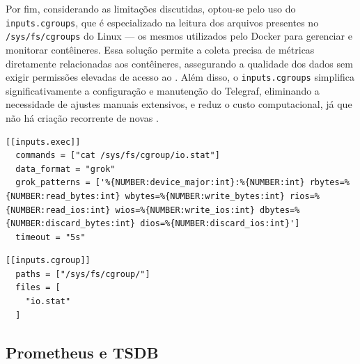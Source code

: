 Por fim, considerando as limitações discutidas, optou-se pelo uso do  \verb|inputs.cgroups|, que é especializado na leitura dos arquivos presentes no  \verb|/sys/fs/cgroups| do Linux --- os mesmos utilizados pelo Docker para gerenciar e monitorar contêineres. Essa solução permite a coleta precisa de métricas diretamente relacionadas aos contêineres, assegurando a qualidade dos dados sem exigir permissões elevadas de acesso ao . Além disso, o \verb|inputs.cgroups| simplifica significativamente a configuração e manutenção do Telegraf, eliminando a necessidade de ajustes manuais extensivos, e reduz o custo computacional, já que não há criação recorrente de novas .


\begin{lstlisting}[caption={Leitura da métrica "io.stat" com inputs.exec}, label={lst:inputs_exec}]
[[inputs.exec]]
  commands = ["cat /sys/fs/cgroup/io.stat"]
  data_format = "grok"
  grok_patterns = ['%{NUMBER:device_major:int}:%{NUMBER:int} rbytes=%{NUMBER:read_bytes:int} wbytes=%{NUMBER:write_bytes:int} rios=%{NUMBER:read_ios:int} wios=%{NUMBER:write_ios:int} dbytes=%{NUMBER:discard_bytes:int} dios=%{NUMBER:discard_ios:int}']
  timeout = "5s"
\end{lstlisting}

\begin{lstlisting}[caption={Leitura da mesma métrica "io.stat" com inputs.cgroups}, label={lst:inputs_cgroup}]
[[inputs.cgroup]]
  paths = ["/sys/fs/cgroup/"]
  files = [
    "io.stat"
  ]
\end{lstlisting}

\subsection{Prometheus e TSDB}
\label{subsection:PrometheusTSDB}

